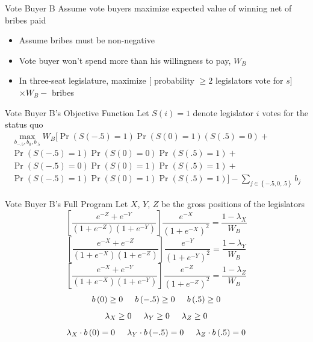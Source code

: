 \documentclass{beamer}
\begin{document}
\begin{frame}{Vote Buyer B}
\pause
Assume vote buyers maximize expected value of winning net of bribes paid  
\pause
\begin{itemize}[<+->]
	\item Assume bribes must be non-negative
	\item Vote buyer won't spend more than his willingness to pay, $W_B$
	\item In three-seat legislature, maximize $[$ probability $\geq 2$ legislators vote for $s ]$ $\times W_B -$ bribes
\end{itemize}
\end{frame}

\begin{frame}{Vote Buyer B's Objective Function}
\pause
Let $S(i) = 1$ denote legislator $i$ votes for the status quo
\pause
\begin{multline*}
			    \max_{b_{-.5}, b_0, b_{.5}} 
					W_B \biggl[ \Pr\left(S\left(-.5\right)=1\right)\Pr\left(S\left(0\right)=1\right)\left(S\left(.5\right)=0\right)  + \\
					\Pr\left(S\left(-.5\right)=1\right)\Pr\left(S\left(0\right)=0\right)\Pr\left(S\left(.5\right)=1\right) + \\
					\Pr\left(S\left(-.5\right)=0\right)\Pr\left(S\left(0\right)=1\right)\Pr\left(S\left(.5\right)=1\right) + \\
					\Pr\left(S\left(-.5\right)=1\right)\Pr\left(S\left(0\right)=1\right)\Pr\left(S\left(.5\right)=1\right) \biggr] - \sum_{j\in \left\{-.5, 0,.5\right\}} b_j
				\end{multline*}
\end{frame}


\begin{frame}{Vote Buyer B's Full Program}
\pause
Let $X$, $Y$, $Z$ be the gross positions of the legislators
\pause
\begin{equation}
    \left[\frac{e^{-Z} + e^{-Y}}{\left(1+e^{-Z}\right)\left(1+e^{-Y}\right)} \right] \frac{e^{-X}}{\left(1+e^{-X}\right)^2}= \frac{1 - \lambda_X}{W_B}
		\label{eq:focB}
\end{equation}
\begin{equation}
    \left[\frac{e^{-X} + e^{-Z}}{\left(1+e^{-X}\right)\left(1+e^{-Z}\right)} \right] \frac{e^{-Y}}{\left(1+e^{-Y}\right)^2}= \frac{1 - \lambda_Y}{W_B}
\end{equation}
\begin{equation}
    \left[\frac{e^{-X} + e^{-Y}}{\left(1+e^{-X}\right)\left(1+e^{-Y}\right)} \right] \frac{e^{-Z}}{\left(1+e^{-Z}\right)^2} = \frac{1 - \lambda_Z}{W_B}
\end{equation}
\[
  b\left(0\right) \geq0 \hskip.2in b\left(-.5\right) \geq0 \hskip.2in b\left(.5\right) \geq0 
\]
\[
  \lambda_X \geq0 \hskip.2in \lambda_Y \geq0 \hskip.2in \lambda_Z \geq0 
\]
\[
  \lambda_X \cdot b\left(0\right) = 0 \hskip.2in \lambda_Y \cdot b\left(-.5\right) = 0 \hskip.2in \lambda_Z \cdot b\left(.5\right) = 0 
\]

\end{frame}
\end{document}
